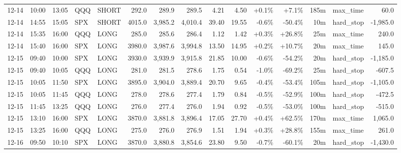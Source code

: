 \documentclass[11pt,a4paper,twoside]{article}
\begin{document}
\begin{landscape}
\begin{center}
\begin{longtable}{>{\color{txtmain}}l l l l l r r r r r r r r >{\color{txtmain}}l r}
12-14 & 10:00 & 13:05 & QQQ & SHORT & 292.0 & 289.9 & 289.5 & 4.21 & 4.50 & \textcolor{wingreen}{+0.1\%} & \textcolor{wingreen}{+7.1\%} & 185m & max\_time & \textcolor{wingreen}{60.0} \\
12-14 & 14:55 & 15:05 & SPX & SHORT & 4015.0 & 3,985.2 & 4,010.4 & 39.40 & 19.55 & \textcolor{lossred}{-0.6\%} & \textcolor{lossred}{-50.4\%} & 10m & hard\_stop & \textcolor{lossred}{-1,985.0} \\
12-14 & 15:35 & 16:00 & QQQ & LONG & 285.0 & 285.6 & 286.4 & 1.12 & 1.42 & \textcolor{wingreen}{+0.3\%} & \textcolor{wingreen}{+26.8\%} & 25m & max\_time & \textcolor{wingreen}{240.0} \\
12-14 & 15:40 & 16:00 & SPX & LONG & 3980.0 & 3,987.6 & 3,994.8 & 13.50 & 14.95 & \textcolor{wingreen}{+0.2\%} & \textcolor{wingreen}{+10.7\%} & 20m & max\_time & \textcolor{wingreen}{145.0} \\
12-15 & 09:40 & 10:00 & SPX & LONG & 3930.0 & 3,939.9 & 3,915.8 & 21.85 & 10.00 & \textcolor{lossred}{-0.6\%} & \textcolor{lossred}{-54.2\%} & 20m & hard\_stop & \textcolor{lossred}{-1,185.0} \\
12-15 & 09:40 & 10:05 & QQQ & LONG & 281.0 & 281.5 & 278.6 & 1.75 & 0.54 & \textcolor{lossred}{-1.0\%} & \textcolor{lossred}{-69.2\%} & 25m & hard\_stop & \textcolor{lossred}{-607.5} \\
12-15 & 10:05 & 11:50 & SPX & LONG & 3895.0 & 3,904.0 & 3,889.4 & 20.70 & 9.65 & \textcolor{lossred}{-0.4\%} & \textcolor{lossred}{-53.4\%} & 105m & hard\_stop & \textcolor{lossred}{-1,105.0} \\
12-15 & 10:05 & 11:45 & QQQ & LONG & 278.0 & 278.6 & 277.4 & 1.79 & 0.84 & \textcolor{lossred}{-0.5\%} & \textcolor{lossred}{-52.9\%} & 100m & hard\_stop & \textcolor{lossred}{-472.5} \\
12-15 & 11:45 & 13:25 & QQQ & LONG & 276.0 & 277.4 & 276.0 & 1.94 & 0.92 & \textcolor{lossred}{-0.5\%} & \textcolor{lossred}{-53.0\%} & 100m & hard\_stop & \textcolor{lossred}{-515.0} \\
12-15 & 13:10 & 16:00 & SPX & LONG & 3870.0 & 3,881.8 & 3,896.4 & 17.05 & 27.70 & \textcolor{wingreen}{+0.4\%} & \textcolor{wingreen}{+62.5\%} & 170m & max\_time & \textcolor{wingreen}{1,065.0} \\
12-15 & 13:25 & 16:00 & QQQ & LONG & 275.0 & 276.0 & 276.9 & 1.51 & 1.94 & \textcolor{wingreen}{+0.3\%} & \textcolor{wingreen}{+28.8\%} & 155m & max\_time & \textcolor{wingreen}{261.0} \\
12-16 & 09:50 & 10:10 & SPX & LONG & 3870.0 & 3,880.8 & 3,854.6 & 23.80 & 9.50 & \textcolor{lossred}{-0.7\%} & \textcolor{lossred}{-60.1\%} & 20m & hard\_stop & \textcolor{lossred}{-1,430.0} \\

\end{longtable}
\end{center}
\end{landscape}
\end{document}
